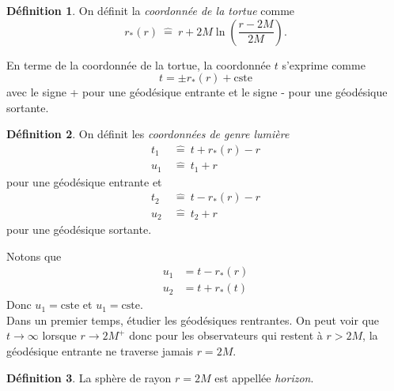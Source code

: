 \documentclass[a4paper,11pt]{report}
\theoremstyle{definition}
\theoremstyle{plain}
\theoremstyle{definition}
\newtheorem{defn}{Définition}[chapter]
\theoremstyle{remark}
\begin{document}
            \begin{defn}
                On définit la \textit{coordonnée de la tortue} comme
                \begin{equation}
                    r_*(r) ~\hat{=}~ r+2M\ln\left( \frac{r-2M}{2M} \right).
                \end{equation}
            \end{defn}
             
            En terme de la coordonnée de la tortue, la coordonnée $t$ s'exprime comme
            \begin{equation}
                 t = \pm r_*(r) + \text{cste}
            \end{equation}
             avec le signe + pour une géodésique entrante et le signe - pour une géodésique sortante.
             
            \begin{defn}
                On définit les \textit{coordonnées de genre lumière}
                \begin{align}
                    t_1 ~&\hat{=}~ t+r_*(r)-r\\
                    u_1 ~&\hat{=}~ t_1+r
                \end{align}
                pour une géodésique entrante et
                \begin{align}
                    t_2 ~&\hat{=}~ t-r_*(r)-r\\
                    u_2 ~&\hat{=}~ t_2+r
                \end{align}
                pour une géodésique sortante.
            \end{defn}
            Notons que 
            \begin{align}
                u_1 &= t-r_*(r)\\
                u_2 &= t+r_*(t)
            \end{align}
            Donc $u_1=\text{cste}$ et $u_1=\text{cste}$.\\
            

            
            Dans un premier temps, étudier les géodésiques rentrantes. On peut voir que $t\to\infty$ lorsque $r\to 2M^+$ donc pour les observateurs qui restent à $r> 2M$, la géodésique entrante ne traverse jamais $r=2M$.
            
            \begin{defn}
                La sphère de rayon $r=2M$ est appellée \textit{horizon}.
            \end{defn}
            
\end{document}
